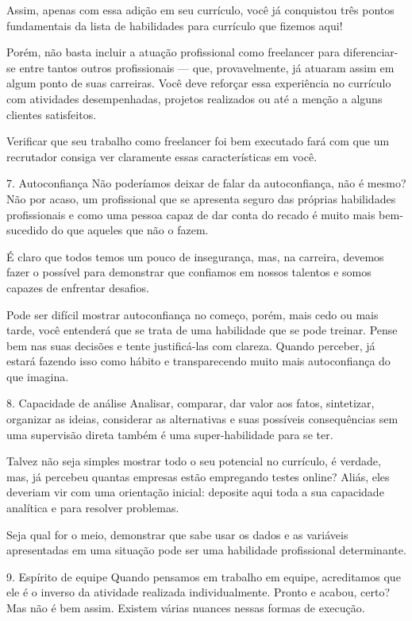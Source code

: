 \begin{commentA}
Assim, apenas com essa adição em seu currículo, você já conquistou três pontos fundamentais da lista de habilidades para currículo que fizemos aqui!

Porém, não basta incluir a atuação profissional como freelancer para diferenciar-se entre tantos outros profissionais — que, provavelmente, já atuaram assim em algum ponto de suas carreiras. Você deve reforçar essa experiência no currículo com atividades desempenhadas, projetos realizados ou até a menção a alguns clientes satisfeitos.

Verificar que seu trabalho como freelancer foi bem executado fará com que um recrutador consiga ver claramente essas características em você.

7. Autoconfiança
Não poderíamos deixar de falar da autoconfiança, não é mesmo? Não por acaso, um profissional que se apresenta seguro das próprias habilidades profissionais e como uma pessoa capaz de dar conta do recado é muito mais bem-sucedido do que aqueles que não o fazem.

É claro que todos temos um pouco de insegurança, mas, na carreira, devemos fazer o possível para demonstrar que confiamos em nossos talentos e somos capazes de enfrentar desafios.

Pode ser difícil mostrar autoconfiança no começo, porém, mais cedo ou mais tarde, você entenderá que se trata de uma habilidade que se pode treinar. Pense bem nas suas decisões e tente justificá-las com clareza. Quando perceber, já estará fazendo isso como hábito e transparecendo muito mais autoconfiança do que imagina.

8. Capacidade de análise
Analisar, comparar, dar valor aos fatos, sintetizar, organizar as ideias, considerar as alternativas e suas possíveis consequências sem uma supervisão direta também é uma super-habilidade para se ter.

Talvez não seja simples mostrar todo o seu potencial no currículo, é verdade, mas, já percebeu quantas empresas estão empregando testes online? Aliás, eles deveriam vir com uma orientação inicial: deposite aqui toda a sua capacidade analítica e para resolver problemas.

Seja qual for o meio, demonstrar que sabe usar os dados e as variáveis apresentadas em uma situação pode ser uma habilidade profissional determinante.

9. Espírito de equipe
Quando pensamos em trabalho em equipe, acreditamos que ele é o inverso da atividade realizada individualmente. Pronto e acabou, certo? Mas não é bem assim. Existem várias nuances nessas formas de execução.


\end{commentA}
